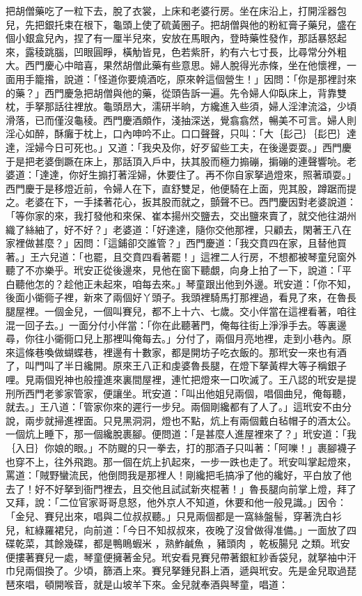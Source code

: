 \begin{showcontents}{}
把胡僧藥吃了一粒下去，脫了衣裳，上床和老婆行房。坐在床沿上，打開淫器包兒，先把銀托束在根下，龜頭上使了硫黃圈子。把胡僧與他的粉紅膏子藥兒，盛在個小銀盒兒內，捏了有一厘半兒來，安放在馬眼內，登時藥性發作，那話暴怒起來，露稜跳腦，凹眼圓睜，橫觔皆見，色若紫肝，約有六七寸長，比尋常分外粗大。西門慶心中暗喜，果然胡僧此藥有些意思。婦人脫得光赤條，坐在他懷裡，一面用手籠揝，說道：「怪道你要燒酒吃，原來幹這個營生！」因問：「你是那裡討來的藥？」西門慶急把胡僧與他的藥，從頭告訴一遍。先令婦人仰臥床上，背靠雙枕，手拏那話往裡放。龜頭昂大，濡研半晌，方纔進入些須，婦人淫津流溢，少頃滑落，已而僅沒龜稜。西門慶酒頗作，淺抽深送，覺翕翕然，暢美不可言。婦人則淫心如醉，酥癱于枕上，口內呻吟不止。口口聲聲，只叫：「大｛髟己｝｛髟巴｝達達，淫婦今日可死也。」又道：「我央及你，好歹留些工夫，在後邊耍耍。」西門慶于是把老婆倒蹶在床上，那話頂入戶中，扶其股而極力搧磞，掮磞的連聲響喨。老婆道：「達達，你好生搧打著淫婦，休要住了。再不你自家拏過燈來，照著頑耍。」西門慶于是移燈近前，令婦人在下，直舒雙足，他便騎在上面，兜其股，蹲踞而提之。老婆在下，一手揉著花心，扳其股而就之，顫聲不已。西門慶因對老婆說道：「等你家的來，我打發他和來保、崔本揚州交鹽去，交出鹽來賣了，就交他往湖州織了絲紬了，好不好？」老婆道：「好達達，隨你交他那裡，只顧去，閑著王八在家裡做甚麼？」因問：「這鋪卻交誰管？」西門慶道：「我交賁四在家，且替他買著。」王六兒道：「也罷，且交賁四看著罷！」這裡二人行房，不想都被琴童兒窗外聽了不亦樂乎。玳安正從後邊來，見他在窗下聽覷，向身上拍了一下，說道：「平白聽他怎的？趁他正未起來，咱每去來。」琴童跟出他到外邊。玳安道：「你不知，後面小衚衕子裡，新來了兩個好丫頭子。我頭裡騎馬打那裡過，看見了來，在魯長腿屋裡。一個金兒，一個叫賽兒，都不上十六、七歲。交小伴當在這裡看著，咱往混一回子去。」一面分付小伴當：「你在此聽著門，俺每往街上淨淨手去。等裏邊尋，你往小衚衕口兒上那裡叫俺每去。」分付了，兩個月亮地裡，走到小巷內。原來這條巷喚做蝴蝶巷，裡邊有十數家，都是開坊子吃衣飯的。那玳安一來也有酒了，叫門叫了半日纔開。原來王八正和虔婆魯長腿，在燈下拏黃桿大等子稱銀子哩。見兩個兇神也般撞進來裏間屋裡，連忙把燈來一口吹滅了。王八認的玳安是提刑所西門老爹家管家，便讓坐。玳安道：「叫出他姐兒兩個，唱個曲兒，俺每聽，就去。」王八道：「管家你來的遲行一步兒。兩個剛纔都有了人了。」這玳安不由分說，兩步就掃進裡面。只見黑洞洞，燈也不點，炕上有兩個戴白毡帽子的酒太公。一個炕上睡下，那一個纔脫裹腳。便問道：「是甚麼人進屋裡來了？」玳安道：「我｛入日｝你娘的眼。」不防颼的只一拳去，打的那酒子只叫著：「阿嚛！」裹腳襪子也穿不上，往外飛跑。那一個在炕上扒起來，一步一跌也走了。玳安叫掌起燈來，罵道：「賊野蠻流民，他倒問我是那裡人！剛纔把毛搞凈了他的纔好，平白放了他去了！好不好拏到衙門裡去，且交他且試試新夾棍著！」魯長腿向前掌上燈，拜了又拜，說：「二位官家哥哥息怒，他外京人不知道，休要和他一般見識。」因令：「金兒、賽兒出來，唱與二位叔叔聽。」只見兩個都是一窩絲盤髻，穿著洗白衫兒，紅綠羅裙兒，向前道：「今日不知叔叔來，夜晚了沒曾做得准備。」一面放了四碟乾菜，其餘幾碟，都是鴨瞗蝦米 ，熟鮓鹹魚 ，豬頭肉 ，乾板腸兒 之類。玳安便摟著賽兒一處，琴童便擁著金兒。玳安看見賽兒帶著銀紅紗香袋兒，就拏袖中汗巾兒兩個換了。少頃，篩酒上來。賽兒拏鍾兒斟上酒，遞與玳安。先是金兒取過琵琶來唱，頓開喉音，就是山坡羊下來。金兒就奉酒與琴童，唱道：


\end{showcontents}
